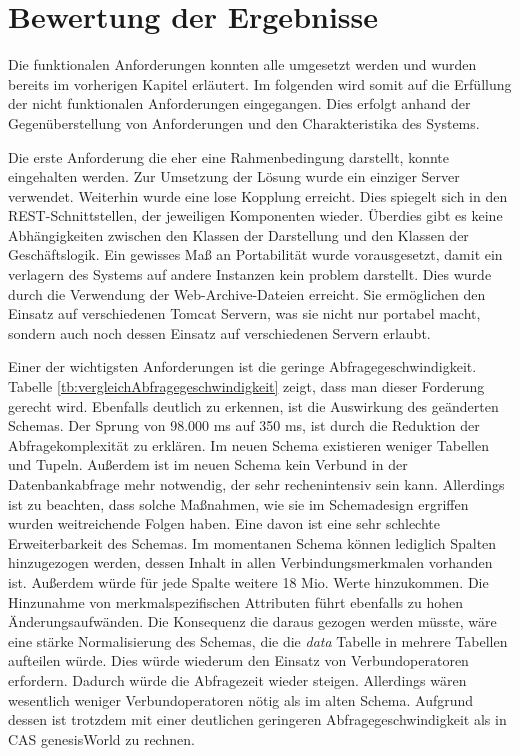 \section{Bewertung der Ergebnisse}
\label{ch:Ergebnis:sec:bewertung}

Die funktionalen Anforderungen konnten alle umgesetzt werden und wurden bereits im vorherigen Kapitel erläutert. Im folgenden wird somit auf die Erfüllung der nicht funktionalen Anforderungen eingegangen. Dies erfolgt anhand der Gegenüberstellung von Anforderungen und den Charakteristika des Systems.

Die erste Anforderung die eher eine Rahmenbedingung darstellt, konnte eingehalten werden. Zur Umsetzung der Lösung wurde ein einziger Server verwendet. Weiterhin wurde eine lose Kopplung erreicht. Dies spiegelt sich in den REST-Schnittstellen, der jeweiligen Komponenten wieder. Überdies gibt es keine Abhängigkeiten zwischen den Klassen der Darstellung und den Klassen der Geschäftslogik. Ein gewisses Maß an Portabilität wurde vorausgesetzt, damit ein verlagern des Systems auf andere Instanzen kein problem darstellt. Dies wurde durch die Verwendung der Web-Archive-Dateien erreicht. Sie ermöglichen den Einsatz auf verschiedenen Tomcat Servern, was sie nicht nur portabel macht, sondern auch noch dessen Einsatz auf verschiedenen Servern erlaubt. 

Einer der wichtigsten Anforderungen ist die geringe Abfragegeschwindigkeit. Tabelle \ref{tb:vergleichAbfragegeschwindigkeit} zeigt, dass man dieser Forderung gerecht wird. Ebenfalls deutlich zu erkennen, ist die Auswirkung des geänderten Schemas. Der Sprung von 98.000 ms auf 350 ms, ist durch die Reduktion der Abfragekomplexität zu erklären. Im neuen Schema existieren weniger Tabellen und Tupeln. Außerdem ist im neuen Schema kein Verbund in der Datenbankabfrage mehr notwendig, der sehr rechenintensiv sein kann. Allerdings ist zu beachten, dass solche Maßnahmen, wie sie im Schemadesign ergriffen wurden weitreichende Folgen haben. Eine davon ist eine sehr schlechte Erweiterbarkeit des Schemas. Im momentanen Schema können lediglich Spalten hinzugezogen werden, dessen Inhalt in allen Verbindungsmerkmalen vorhanden ist. Außerdem würde für jede Spalte weitere 18 Mio. Werte hinzukommen. Die Hinzunahme von merkmalspezifischen Attributen führt ebenfalls zu hohen Änderungsaufwänden. Die Konsequenz die daraus gezogen werden müsste, wäre eine stärke Normalisierung des Schemas, die die \textit{data} Tabelle in mehrere Tabellen aufteilen würde. Dies würde wiederum den Einsatz von Verbundoperatoren erfordern. Dadurch würde die Abfragezeit wieder steigen. Allerdings wären wesentlich weniger Verbundoperatoren nötig als im alten Schema. Aufgrund dessen ist trotzdem mit einer deutlichen geringeren Abfragegeschwindigkeit als in CAS genesisWorld zu rechnen.  

